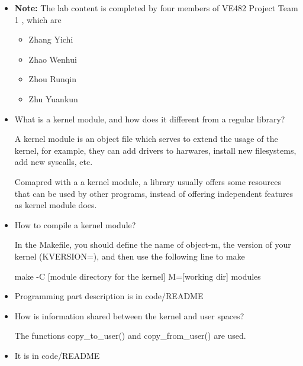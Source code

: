 \documentclass{article}
\begin{document}
\begin{itemize}

\item    {\bf Note: } The lab content is completed by four members of VE482 Project Team 1 , which are 

\begin{itemize}
    \item Zhang Yichi
    \item Zhao Wenhui
    \item Zhou Runqin
    \item Zhu Yuankun
\end{itemize}

\item What is a kernel module, and how does it different from a regular library?

A kernel module is an object file which serves to extend the usage of the kernel, for example, they can add drivers to harwares, install new filesystems, add new syscalls, etc.

Comapred with a a kernel module, a library usually offers some resources that can be used by other programs, instead of offering independent features as kernel module does.

\item How to compile a kernel module?

In the Makefile, you should define the name of object-m, the version of your kernel (KVERSION=), and then use the following line to make 

make -C [module directory for the kernel] M=[working dir] modules


\item Programming part description is in code/README

\item How is information shared between the kernel and user spaces? 

The functions copy\_to\_user() and copy\_from\_user() are used.

\item It is in code/README

\end{itemize}
\end{document}
